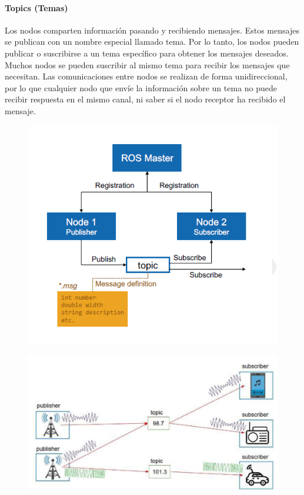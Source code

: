             \paragraph{Topics (Temas)}
                Los nodos comparten información pasando y recibiendo mensajes. Estos mensajes se publican con un nombre especial llamado tema. Por lo tanto, los nodos pueden publicar o suscribirse a un tema específico para obtener los mensajes deseados. Muchos nodos se pueden suscribir al mismo tema para recibir los mensajes que necesitan. Las comunicaciones entre nodos se realizan de forma unidireccional, por lo que cualquier nodo que envíe la información sobre un tema no puede recibir respuesta en el mismo canal, ni saber si el nodo receptor ha recibido el mensaje.
            \begin{figure}[htb]
                \centering
                \includegraphics[width=0.7\linewidth]{Main/Chapter3/Images3/n_s_a_7.png}
                \caption{}
                \label{f:Cap3_conceptos_7}
            \end{figure} 
            \begin{figure}[htb]
                \centering
                \includegraphics[width=0.75\linewidth]{Main/Chapter3/Images3/n_s_a_8.png}
                \caption{}
                \label{f:Cap3_conceptos_8}
            \end{figure} 


